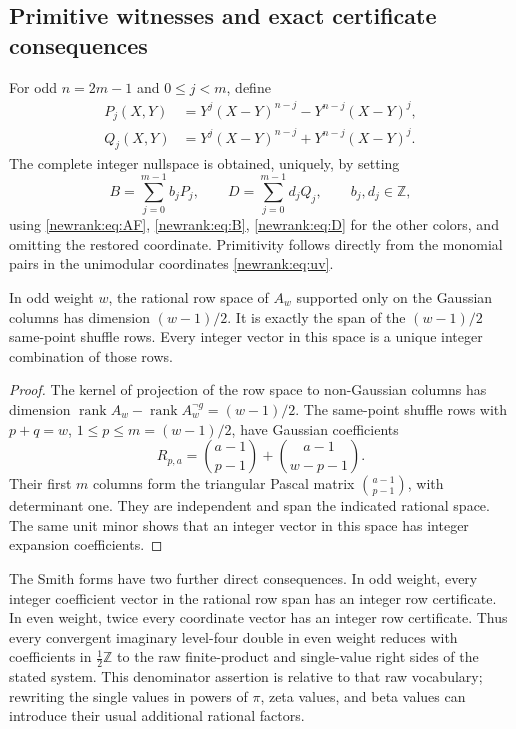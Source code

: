 \subsection{Primitive witnesses and exact certificate consequences}

For odd $n=2m-1$ and $0\le j<m$, define
\begin{align*}
 P_j(X,Y)&=Y^j(X-Y)^{n-j}-Y^{n-j}(X-Y)^j,\\
 Q_j(X,Y)&=Y^j(X-Y)^{n-j}+Y^{n-j}(X-Y)^j.
\end{align*}
The complete integer nullspace is obtained, uniquely, by setting
\[
 B=\sum_{j=0}^{m-1}b_jP_j,\qquad
 D=\sum_{j=0}^{m-1}d_jQ_j,\qquad b_j,d_j\in\mathbb Z,
\]
using \eqref{newrank:eq:AF}, \eqref{newrank:eq:B},
\eqref{newrank:eq:D} for the other colors, and omitting the restored
coordinate.  Primitivity follows directly from the monomial pairs in
the unimodular coordinates \eqref{newrank:eq:uv}.

\begin{corollary}
\label{newrank:cor:gaussian}
In odd weight $w$, the rational row space of $A_w$ supported only on the
Gaussian columns has dimension $(w-1)/2$.  It is exactly the span of the
$(w-1)/2$ same-point shuffle rows.  Every integer vector in this space
is a unique integer combination of those rows.
\end{corollary}
\begin{proof}
The kernel of projection of the row space to non-Gaussian columns has
dimension
$\operatorname{rank}A_w-\operatorname{rank}A_w^{\neg g}=(w-1)/2$.
The same-point shuffle rows with $p+q=w$, $1\le p\le m=(w-1)/2$,
have Gaussian coefficients
\[
 R_{p,a}=\binom{a-1}{p-1}+\binom{a-1}{w-p-1}.
\]
Their first $m$ columns form the triangular Pascal matrix
$\binom{a-1}{p-1}$, with determinant one.  They are independent and
span the indicated rational space.  The same unit minor shows that an
integer vector in this space has integer expansion coefficients.
\end{proof}

The Smith forms have two further direct consequences.  In odd weight,
every integer coefficient vector in the rational row span has an integer
row certificate.  In even weight, twice every coordinate vector has an
integer row certificate.  Thus every convergent imaginary level-four
double in even weight reduces with coefficients in $\tfrac12\mathbb Z$
to the raw finite-product and single-value right sides of the stated
system.  This denominator assertion is relative to that raw vocabulary;
rewriting the single values in powers of $\pi$, zeta values, and beta
values can introduce their usual additional rational factors.


